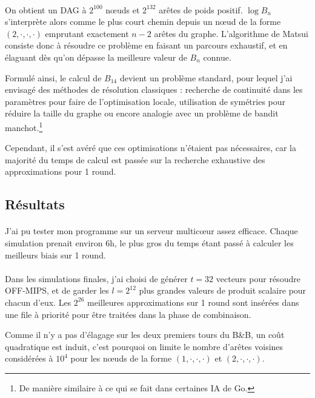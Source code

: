 \documentclass{scrartcl}
\begin{document}
\paragraph*{}
On obtient un DAG à $2^{100}$ n\oe{}uds et $2^{132}$ arêtes de poids positif. $\log B_n$ s'interprète alors comme le plus court chemin depuis un n\oe{}ud
de la forme $(2,\cdot,\cdot,\cdot)$ emprutant exactement $n-2$ arêtes du graphe. L'algorithme de Matsui consiste donc à résoudre ce problème en
faisant un parcours exhaustif, et en élaguant dès qu'on dépasse la meilleure valeur de $B_n$ connue.

Formulé ainsi, le calcul de $B_{14}$ devient un problème standard, pour lequel j'ai envisagé des méthodes de résolution classiques : recherche de continuité dans les
paramètres pour faire de l'optimisation locale, utilisation de symétries pour réduire la taille du graphe ou encore
analogie avec un problème de bandit manchot.\footnote{De manière similaire à ce qui se fait dans certaines IA de Go.}

Cependant, il s'est avéré que ces optimisations n'étaient pas nécessaires, car la majorité du temps de calcul est passée sur la recherche
exhaustive des approximations pour 1 round.

\subsection{Résultats}

\paragraph*{}
J'ai pu tester mon programme sur un serveur multic\oe{}ur assez efficace. Chaque simulation prenait
environ 6h, le plus gros du temps étant passé à calculer les meilleurs biais sur 1 round.

\paragraph*{}
Dans les simulations finales, j'ai choisi de générer $t=32$ vecteurs pour résoudre OFF-MIPS, et de
garder les $l=2^{12}$ plus grandes valeurs de produit scalaire pour chacun d'eux. Les $2^{26}$ 
meilleures approximations sur 1 round sont insérées dans une file à priorité pour être
traitées dans la phase de combinaison.

Comme il n'y a pas d'élagage sur les deux premiers tours du B\&B, un coût quadratique est induit,
c'est pourquoi on limite le nombre d'arêtes voisines considérées à $10^4$ pour les n\oe{}uds de la forme $(1, \cdot, \cdot, \cdot)$
et $(2, \cdot, \cdot, \cdot)$.
\end{document}
